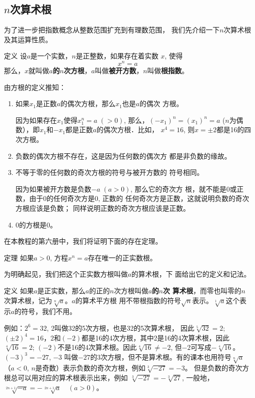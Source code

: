 \subsection{$n$次算术根}
为了进一步把指数概念从整数范围扩充到有理数范围，
我们先介绍一下$n$次算术根及其运算性质。

\begin{blk}{定义}
 设$a$是一个实数，$n$是正整数，如果存在着实数
$x$, 使得
$$x^n=a$$
那么，$x$就叫做\textbf{$a$的$n$次方根}，$a$叫做\textbf{被开方数}，$n$叫做\textbf{根指数}。   
\end{blk}
 
由方根的定义推知：
\begin{enumerate}
    \item 如果$x_1$是正数$a$的偶次方根，那么$x_1$也是$a$的偶次
    方根。

    因为如果存在$x_1$使得$x_1^n=a\; (>0)$, 那么，$(-x_1)^n=(x_1)^n=a$ ($n$为偶数），即$x_1$和$-x_1$都是正数$a$的偶次方根．比如，
$x^4=16$, 则$x=\pm 2$都是16的四次方根。
\item 负数的偶次方根不存在，这是因为任何数的偶次方
都是非负数的缘故。
\item 不等于零的任何数的奇次方根的符号与被开方数的
符号相同。

因为如果被开方数是负数$-a\; (a>0)$, 那么它的奇次方
根，就不能是0或正数，由于0的任何奇次方是0, 正数的
任何奇次方是正数，这就说明负数的奇次方根应该是负数；
同样说明正数的奇次方根应该是正数。
\item 0的方根是0。
\end{enumerate}

在本教程的第六册中，我们将证明下面的存在定理。


\begin{blk}{定理}
    如果$a>0$, 方程$x^n=a$存在唯一的正实数根。
\end{blk}

为明确起见，我们把这个正实数方根叫做$a$的算术根，下
面给出它的定义和记法。


\begin{blk}{定义}
    如果$a$是正实数，那么$a$的正的$n$次方根叫做\textbf{$a$的$n$次
算术根}，而零也叫零的$n$次算术根，记为$\sqrt[n]{a}$。$a$的算术平方根
用不带根指数的符号$\sqrt{n}$表示。$\sqrt[1]{a}$这个表示$a$的符号，我们不用。
\end{blk}

例如：$2^6=32$, 2叫做32的5次方根，也是32的5次算术根，
因此$\sqrt[5]{32}=2$; $(\pm 2)^4=16$，$2$和$(-2)$都是16的4次方根，其中2是16的4次算术根，因此$\sqrt[4]{16}=2$; $(-2)$不是16的4次算术根。因此$\sqrt[4]{16}\ne -2$, 但$-2$可写成$-\sqrt[4]{16}$。$(-3)^3=-27$, $-3$
叫做$-27$的3次方根，但不是算术根。有的课本也用符号$\sqrt[n]{a}$
（$a<0$, $n$是奇数）表示负数的奇次方根，例如$\sqrt[3]{-27}=-3$。
但是负数的奇次方根总可以用对应的算术根表示出来，例如
$\sqrt[3]{-27}=-\sqrt[3]{27}$, 一般地，$\sqrt[2n+1]{-a}=-\sqrt[2n+1]{a}\quad  (a>0)$。

